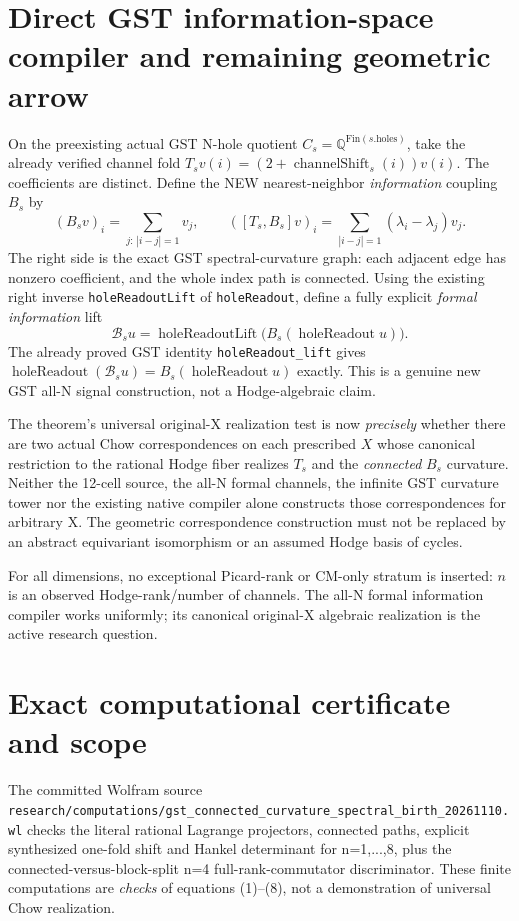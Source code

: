 \documentclass[11pt]{article}
\newcommand{\Q}{\mathbb Q}
\begin{document}
\section{Direct GST information-space compiler and remaining geometric arrow}
On the preexisting actual GST N-hole quotient
\(C_s=\Q^{\mathrm{Fin}(s.\mathrm{holes})}\), take the already verified channel fold
\(T_s v(i)=(2+\operatorname{channelShift}_s(i))v(i)\).
The coefficients are distinct. Define the NEW nearest-neighbor \emph{information} coupling $B_s$ by
\[
 (B_s v)_i=
 \sum_{j:\,|i-j|=1}v_j,
 \qquad
 ( [T_s,B_s]v)_i=\sum_{|i-j|=1}(\lambda_i-\lambda_j)v_j.
 \tag{8}
\]
The right side is the exact GST spectral-curvature graph: each adjacent edge has nonzero coefficient, and the whole index path is connected.
Using the existing right inverse \texttt{holeReadoutLift} of \texttt{holeReadout}, define a fully explicit \emph{formal information} lift
\[
 \mathcal B_s u=
 \operatorname{holeReadoutLift}\bigl(B_s(\operatorname{holeReadout}u)\bigr).
 \tag{9}
\]
The already proved GST identity \texttt{holeReadout\_lift} gives
\(\operatorname{holeReadout}(\mathcal B_su)
=B_s(\operatorname{holeReadout}u)\) exactly. This is a genuine new GST all-N signal construction, not a Hodge-algebraic claim.

The theorem's universal original-X realization test is now \emph{precisely} whether there are two actual Chow correspondences on each prescribed $X$ whose canonical restriction to the rational Hodge fiber realizes $T_s$ and the \emph{connected} $B_s$ curvature. Neither the 12-cell source, the all-N formal channels, the infinite GST curvature tower nor the existing native compiler alone constructs those correspondences for arbitrary X. The geometric correspondence construction must not be replaced by an abstract equivariant isomorphism or an assumed Hodge basis of cycles.

For all dimensions, no exceptional Picard-rank or CM-only stratum is inserted: $n$ is an observed Hodge-rank/number of channels. The all-N formal information compiler works uniformly; its canonical original-X algebraic realization is the active research question.

\section{Exact computational certificate and scope}
The committed Wolfram source \texttt{research/computations/gst_connected_curvature_spectral_birth_20261110.wl} checks the literal rational Lagrange projectors, connected paths, explicit synthesized one-fold shift and Hankel determinant for n=1,...,8, plus the connected-versus-block-split n=4 full-rank-commutator discriminator. These finite computations are \emph{checks} of equations (1)--(8), not a demonstration of universal Chow realization.
\end{document}

